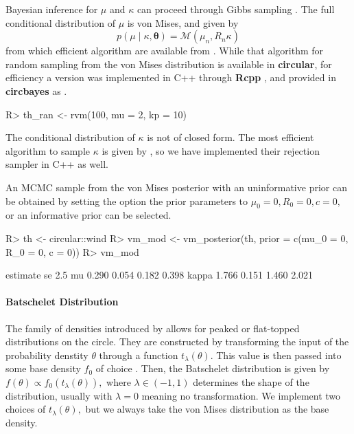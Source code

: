 \documentclass{article}
\newcommand{\code}[1]{\texttt{\detokenize{#1}}}
\let\proglang=\textsf
\newcommand{\pkg}[1]{\textbf{#1}}
\newenvironment{CodeChunk}{}{}
\begin{document}
Bayesian inference for \(\mu\) and \(\kappa\) can proceed through Gibbs
sampling \citep{chib1995understanding}. The full conditional
distribution of \(\mu\) is von Mises, and given by \begin{equation}
p(\mu \mid \kappa, \boldsymbol{\theta}) = \mathcal{M}(\mu_n, R_n \kappa)
\end{equation} from which efficient algorithm are available from
\citet{best1981bias}. While that algorithm for random sampling from the
von Mises distribution is available in \pkg{circular}, for efficiency a
version was implemented in \proglang{C++} through \pkg{Rcpp}
\citep{rcpp}, and provided in \pkg{circbayes} as \code{rvm}.

\begin{CodeChunk}
	
	\begin{CodeInput}
		R> th_ran <- rvm(100, mu = 2, kp = 10)
	\end{CodeInput}
\end{CodeChunk}

The conditional distribution of \(\kappa\) is not of closed form. The
most efficient algorithm to sample \(\kappa\) is given by
\citet{forbes2015fast}, so we have implemented their rejection sampler
in \proglang{C++} as well.

An MCMC sample from the von Mises posterior with an uninformative prior
can be obtained by setting the option the prior parameters to
\(\mu_0 = 0, R_0 = 0, c = 0,\) or an informative prior can be selected.

\begin{CodeChunk}
	
	\begin{CodeInput}
		R> th     <- circular::wind
		R> vm_mod <- vm_posterior(th, prior = c(mu_0 = 0, R_0 = 0, c = 0))
		R> vm_mod
	\end{CodeInput}
	
	\begin{CodeOutput}
		estimate    se  2.5%
		mu       0.290 0.054 0.182 0.398
		kappa    1.766 0.151 1.460 2.021
	\end{CodeOutput}
\end{CodeChunk}

\hypertarget{batschelet-distribution}{%
	\paragraph{Batschelet Distribution}\label{batschelet-distribution}}

The family of densities introduced by \citet{batschelet1981circular}
allows for peaked or flat-topped distributions on the circle. They are
constructed by transforming the input of the probability denstity
\(\theta\) through a function \(t_{\lambda}(\theta).\) This value is
then passed into some base density \(f_0\) of choice
\citep{abe2010symmetric, pewsey2011extension}. Then, the Batschelet
distribution is given by \(f(\theta) \propto f_0(t_\lambda(\theta)),\)
where \(\lambda \in (-1, 1)\) determines the shape of the distribution,
usually with \(\lambda = 0\) meaning no transformation. We implement two
choices of \(t_{\lambda}(\theta),\) but we always take the von Mises
distribution as the base density.
\end{document}
